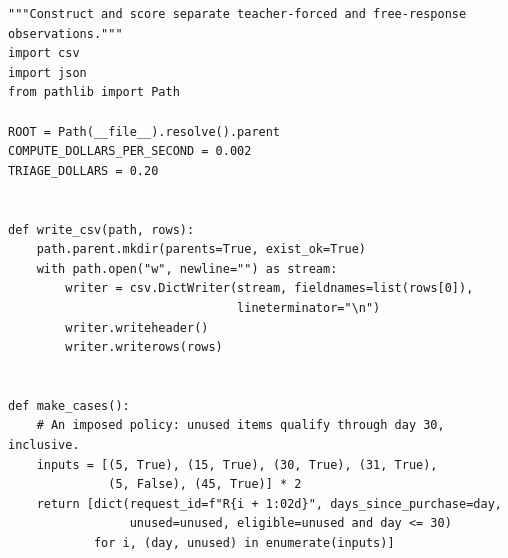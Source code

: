 \begin{Verbatim}[breaklines,breakanywhere,fontsize=\small]
"""Construct and score separate teacher-forced and free-response observations."""
import csv
import json
from pathlib import Path

ROOT = Path(__file__).resolve().parent
COMPUTE_DOLLARS_PER_SECOND = 0.002
TRIAGE_DOLLARS = 0.20


def write_csv(path, rows):
    path.parent.mkdir(parents=True, exist_ok=True)
    with path.open("w", newline="") as stream:
        writer = csv.DictWriter(stream, fieldnames=list(rows[0]),
                                lineterminator="\n")
        writer.writeheader()
        writer.writerows(rows)


def make_cases():
    # An imposed policy: unused items qualify through day 30, inclusive.
    inputs = [(5, True), (15, True), (30, True), (31, True),
              (5, False), (45, True)] * 2
    return [dict(request_id=f"R{i + 1:02d}", days_since_purchase=day,
                 unused=unused, eligible=unused and day <= 30)
            for i, (day, unused) in enumerate(inputs)]



\end{Verbatim}
